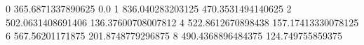 0 365.6871337890625 0.0
1 836.040283203125 470.3531494140625
2 502.0631408691406 136.37600708007812
4 522.8612670898438 157.17413330078125
6 567.56201171875 201.8748779296875
8 490.4368896484375 124.749755859375
